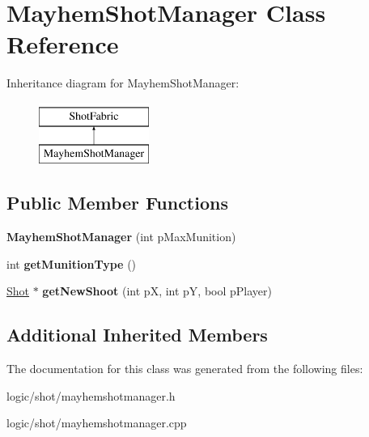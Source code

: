 \hypertarget{class_mayhem_shot_manager}{\section{Mayhem\-Shot\-Manager Class Reference}
\label{class_mayhem_shot_manager}
}
Inheritance diagram for Mayhem\-Shot\-Manager\-:\begin{figure}[H]
\begin{center}
\leavevmode
\includegraphics[height=2.000000cm]{class_mayhem_shot_manager}
\end{center}
\end{figure}
\subsection*{Public Member Functions}
\begin{DoxyCompactItemize}
\item 
\hypertarget{class_mayhem_shot_manager_a3be4a6716d2fc370643d97cfbba9e8a0}{{\bfseries Mayhem\-Shot\-Manager} (int p\-Max\-Munition)}\label{class_mayhem_shot_manager_a3be4a6716d2fc370643d97cfbba9e8a0}

\item 
\hypertarget{class_mayhem_shot_manager_ab55fb0975a345e534dfa34339511a7a1}{int {\bfseries get\-Munition\-Type} ()}\label{class_mayhem_shot_manager_ab55fb0975a345e534dfa34339511a7a1}

\item 
\hypertarget{class_mayhem_shot_manager_a184f651f761cc1fb19e8594f43cecfb3}{\hyperlink{class_shot}{Shot} $\ast$ {\bfseries get\-New\-Shoot} (int p\-X, int p\-Y, bool p\-Player)}\label{class_mayhem_shot_manager_a184f651f761cc1fb19e8594f43cecfb3}

\end{DoxyCompactItemize}
\subsection*{Additional Inherited Members}


The documentation for this class was generated from the following files\-:\begin{DoxyCompactItemize}
\item 
logic/shot/mayhemshotmanager.\-h\item 
logic/shot/mayhemshotmanager.\-cpp\end{DoxyCompactItemize}
